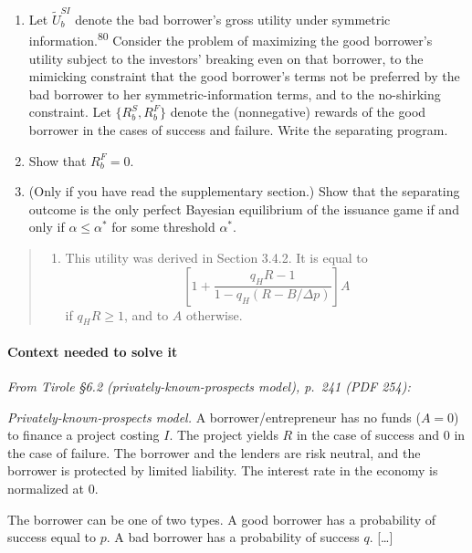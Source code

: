 \documentclass[11pt,a4paper]{article}
\providecommand{\tightlist}{\setlength{\itemsep}{0pt}\setlength{\parskip}{0pt}}
\begin{document}
\begin{enumerate}
\def\labelenumi{(\roman{enumi})}
\item
  Let \(\tilde{U}_b^{SI}\) denote the bad borrower's gross utility under symmetric
  information.\textsuperscript{80} Consider the problem of maximizing the good borrower's utility
  subject to the investors' breaking even on that borrower, to the mimicking constraint that the
  good borrower's terms not be preferred by the bad borrower to her symmetric-information terms, and
  to the no-shirking constraint. Let \(\{R_b^S, R_b^F\}\) denote the (nonnegative) rewards of the
  good borrower in the cases of success and failure. Write the separating program.
\item
  Show that \(R_b^F = 0\).
\item
  (Only if you have read the supplementary section.) Show that the separating outcome is the only
  perfect Bayesian equilibrium of the issuance game if and only if \(\alpha \leqslant \alpha^*\) for
  some threshold \(\alpha^*\).
\end{enumerate}

\begin{quote}
\begin{enumerate}
\def\labelenumi{\arabic{enumi}.}
\setcounter{enumi}{79}
\tightlist
\item
  This utility was derived in Section 3.4.2. It is equal to
  \[\left[1 + \frac{q_H R - 1}{1 - q_H(R - B/\Delta p)}\right]A\] if \(q_H R \geqslant 1\), and to
  \(A\) otherwise.
\end{enumerate}
\end{quote}

\paragraph{Context needed to solve it}

\emph{From Tirole §6.2 (privately-known-prospects model), p.~241 (PDF 254):}

\emph{Privately-known-prospects model.} A borrower/entrepreneur has no funds (\(A = 0\)) to finance
a project costing \(I\). The project yields \(R\) in the case of success and 0 in the case of
failure. The borrower and the lenders are risk neutral, and the borrower is protected by limited
liability. The interest rate in the economy is normalized at 0.

The borrower can be one of two types. A good borrower has a probability of success equal to \(p\). A
bad borrower has a probability of success \(q\). {[}\ldots{]}
\end{document}
